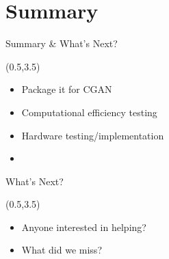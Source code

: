 \documentclass[xcolor=x11names,compress,handout]{beamer}
\begin{document}
\section{Summary}
\begin{frame}{Summary \& What's Next?}

	\begin{textblock}{14.5}(0.5,3.5)
		\begin{itemize}
			\item Package it for CGAN
			\item Computational efficiency testing
			\item Hardware testing/implementation
			\item 
		\end{itemize}
	\end{textblock}
\end{frame}


\begin{frame}{What's Next?}

	\begin{textblock}{14.5}(0.5,3.5)
		\begin{itemize}
			\item Anyone interested in helping? 
			\item What did we miss?
		\end{itemize}
	\end{textblock}
\end{frame}
\end{document}
